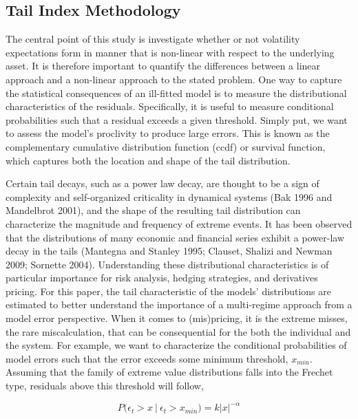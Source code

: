 \documentclass[11pt,a4paper,oldfontcommands]{memoir}
\begin{document}
{\subsection{Tail Index Methodology}

The central point of this study is investigate whether or not volatility expectations form in manner that is non-linear with respect to the underlying asset. It is therefore important to quantify the differences between a linear approach and a non-linear approach to the stated problem. One way to capture the statistical consequences of an ill-fitted model is to measure the distributional characteristics of the residuals. Specifically, it is useful to measure conditional probabilities such that a residual exceeds a given threshold. Simply put, we want to assess the model's proclivity to produce large errors. This is known as the complementary cumulative distribution function (ccdf) or survival function, which captures both the location and shape of the tail distribution. %

Certain tail decays, such as a power law decay, are thought to be a sign of complexity and self-organized criticality in dynamical systems (Bak 1996 and Mandelbrot 2001), and the shape of the resulting tail distribution can characterize the magnitude and frequency of extreme events. It has been observed that the distributions of many economic and financial series exhibit a power-law decay in the tails (Mantegna and Stanley 1995; Clauset, Shalizi and Newman 2009; Sornette 2004). Understanding these distributional characteristics is of particular importance for risk analysis, hedging strategies, and derivatives pricing. For this paper, the tail characteristic of the models' distributions are estimated to better understand the importance of a multi-regime approach from a model error perspective. When it comes to (mis)pricing, it is the extreme misses, the rare miscalculation, that can be consequential for the both the individual and the system. For example, we want to characterize the conditional probabilities of model errors such that the error exceeds some minimum threshold, $x_{min}$. Assuming that the family of extreme value distributions falls into the Frechet type, residuals above this threshold will follow,

$$
P(\epsilon_t > x \ | \ \epsilon_t > x_{min}) = k|x|^{-\alpha}
$$

}
\end{document}
